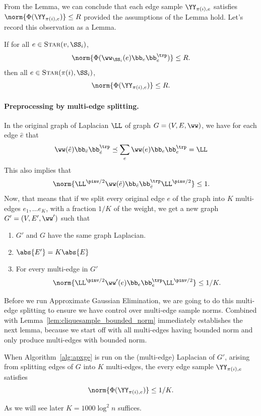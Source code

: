 From the Lemma, we can conclude that each edge sample $\YY_{\pi(i),e}$
satisfies
$\norm{\Phi(\YY_{\pi(i),e})} \leq R$
provided the assumptions of the
Lemma hold. Let's record this observation as a Lemma.
\begin{lemma}
  If for all $e \in \vstar{v}{\SS_i}$,
  \[
    \norm{\Phi(\ww_{\SS_i }(e)\bb_{e} \bb_{e}^{\trp})}
    \leq
    R
    .
  \]
  then all $e \in \vstar{\pi(i)}{\SS_i}$,
  \[
    \norm{\Phi(\YY_{\pi(i),e})} \leq R
 .
  \]
\end{lemma}

\paragraph{Preprocessing by multi-edge splitting.}
In the original graph of Laplacian $\LL$ of graph $G = (V,E,\ww)$, we
have for each edge $\hat{e}$ that
\[
  \ww(\hat{e}) \bb_{\hat{e}}\bb_{\hat{e}}^{\trp} \preceq \sum_e \ww(e) \bb_{e}\bb_{e}^{\trp}= \LL
\]
This also implies that
\[
  \norm{\LL^{\pinv/2}  \ww(\hat{e})  \bb_{\hat{e}}\bb_{\hat{e}}^{\trp} \LL^{\pinv/2} }\leq 1.
\]
Now, that means that if we split every original edge $e$ of the graph
into $K$ multi-edges $e_1, \ldots e_K$, with a fraction $1/K$ of the
weight, we get a new graph $G' = (V, E', \ww')$ such that
\begin{claim}
  \label{clm:edgesplit}
  \noindent
  \begin{enumerate}
  \item $G'$ and $G$ have the same graph Laplacian.
  \item $\abs{E'} = K\abs{E}$
  \item For every multi-edge in $G'$
    \[
      \norm{\LL^{\pinv/2} \ww'(e) \bb_{e}\bb_{e}^{\trp} \LL^{\pinv/2}
      }\leq 1/K.
    \]
  \end{enumerate}
\end{claim}
Before we run Approximate Gaussian Elimination, we are going to do
this multi-edge splitting to ensure we have control over multi-edge
sample norms.
%
Combined with Lemma~\ref{lem:cliquesample_bounded_norm} immediately
establishes the next lemma, because we start off with all multi-edges
having bounded norm and only produce multi-edges with bounded norm.
\begin{lemma}
  \label{lem:edgesampnorm}
  When Algorithm~\ref{alg:apxge} is run on the (multi-edge) Laplacian of $G'$,
  arising from splitting edges of $G$ into $K$ multi-edges, the every
  edge sample $\YY_{\pi(i),e}$ satisfies
  \[
    \norm{\Phi(\YY_{\pi(i),e})} \leq 1/K
 .
  \]
\end{lemma}
As we will see later $K = 1000 \log^2 n$ suffices.

